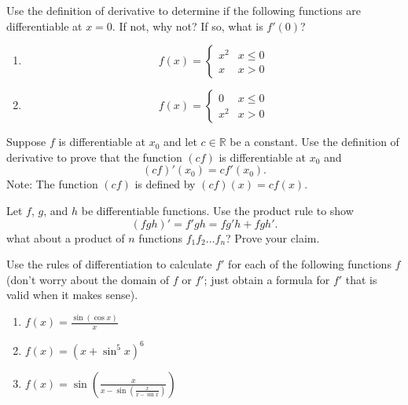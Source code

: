 \documentclass[12pt,letterpaper]{hmcpset}
\begin{document}

\begin{problem}[1]
  Use the definition of derivative to determine if the following functions are differentiable at
$x = 0$. If not, why not? If so, what is $f'(0)$?
\begin{enumerate}[label=(\alph*)]
\item \[ f(x) =
    \begin{cases}
      x^2 &x \leq 0 \\
      x   &x > 0
    \end{cases}
  \]
\item \[ f(x) =
    \begin{cases}
    0 &x \leq 0 \\
    x^2 &x > 0
    \end{cases}
    \]
\end{enumerate}
\end{problem}
\begin{solution}

\end{solution}
\pagebreak
\begin{problem}[2]
  Suppose $f$ is differentiable at $x_0$ and let $c\in\mathbb{R}$ be a constant. Use the definition of derivative to prove that the function $(cf)$ is differentiable at $x_0$ and
  \[ (cf)' (x_0) = cf'(x_0). \]
  Note: The function $(cf)$ is defined by $(cf)(x) = cf(x)$.
\end{problem}
\begin{solution}

\end{solution}
\pagebreak
\begin{problem}[3]
  Let $f$, $g$, and $h$ be differentiable functions. Use the product rule to show
  \[ (fgh)' = f'gh = fg'h + fgh'. \]
  what about a product of $n$ functions $f_1f_2\dots f_n$? Prove your claim.
\end{problem}
\begin{solution}
  
\end{solution}
\pagebreak
\begin{problem}[4]
  Use the rules of differentiation to calculate $f'$ for each of the following functions $f$ (don’t worry about the domain of $f$ or $f'$; just obtain a formula for $f'$ that is valid when it makes sense).
  \begin{enumerate}[label=(\alph*)]
  \item $\displaystyle f(x) = \frac{\sin(\cos x)}{x}$
  \item $\displaystyle f(x) = \left(x + \sin^5 x\right)^6$
  \item $\displaystyle f(x) = \sin\left( \frac{x}{x - \sin\left( \frac{x}{x-\sin x}\right)} \right)$
  \end{enumerate}
\end{problem}
\end{document}
